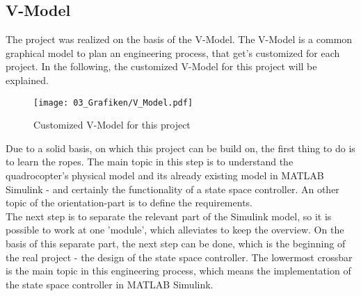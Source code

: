 \subsection{V-Model}\label{chapter_V_MODEL}

The project was realized on the basis of the V-Model. The V-Model is a common graphical model to plan an engineering process, that get's customized for each project. In the following, the customized V-Model for this project will be explained.

\begin{figure}[htbp]
	\centering
		\texttt{[image: 03\_Grafiken/V\_Model.pdf]}
	\caption{Customized V-Model for this project}
	\label{fig:V_Model}
\end{figure}

Due to a solid basis, on which this project can be build on, the first thing to do is to learn the ropes. The main topic in this step is to understand the quadrocopter's physical model and its already existing model in MATLAB Simulink - and certainly the functionality of a state space controller. An other topic of the orientation-part is to define the requirements. \\
The next step is to separate the relevant part of the Simulink model, so it is possible to work at one 'module', which alleviates to keep the overview. On the basis of this separate part, the next step can be done, which is the beginning of the real project - the design of the state space controller. The lowermost crossbar is the main topic in this engineering process, which means the implementation of the state space controller in MATLAB Simulink. \\
